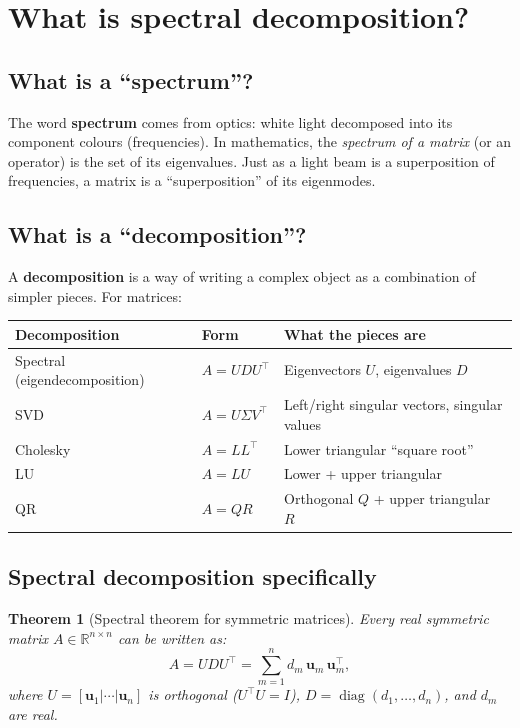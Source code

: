 \documentclass[11pt,a4paper]{article}
\newtheorem{theorem}{Theorem}[section]
\newcommand{\R}{\mathbb{R}}
\newcommand{\diag}{\operatorname{diag}}
\begin{document}
\section{What is spectral decomposition?}
\label{sec:q12}

\subsection{What is a ``spectrum''?}

The word \textbf{spectrum} comes from optics: white light decomposed into its component colours (frequencies).  In mathematics, the \emph{spectrum of a matrix} (or an operator) is the set of its eigenvalues.  Just as a light beam is a superposition of frequencies, a matrix is a ``superposition'' of its eigenmodes.

\subsection{What is a ``decomposition''?}

A \textbf{decomposition} is a way of writing a complex object as a combination of simpler pieces.  For matrices:
\begin{center}
\small
\begin{tabular}{@{}lll@{}}
\toprule
\textbf{Decomposition} & \textbf{Form} & \textbf{What the pieces are} \\
\midrule
Spectral (eigendecomposition) & $A = UDU^\top$ & Eigenvectors $U$, eigenvalues $D$ \\
SVD & $A = U\Sigma V^\top$ & Left/right singular vectors, singular values \\
Cholesky & $A = LL^\top$ & Lower triangular ``square root'' \\
LU & $A = LU$ & Lower + upper triangular \\
QR & $A = QR$ & Orthogonal $Q$ + upper triangular $R$ \\
\bottomrule
\end{tabular}
\end{center}

\subsection{Spectral decomposition specifically}

\begin{theorem}[Spectral theorem for symmetric matrices]
Every real symmetric matrix $A \in \R^{n \times n}$ can be written as:
\begin{equation}
  A = U D U^\top = \sum_{m=1}^{n} d_m\,\mathbf{u}_m\,\mathbf{u}_m^\top,
\end{equation}
where $U = [\mathbf{u}_1 | \cdots | \mathbf{u}_n]$ is orthogonal ($U^\top U = I$), $D = \diag(d_1, \dots, d_n)$, and $d_m$ are real.
\end{theorem}
\end{document}
